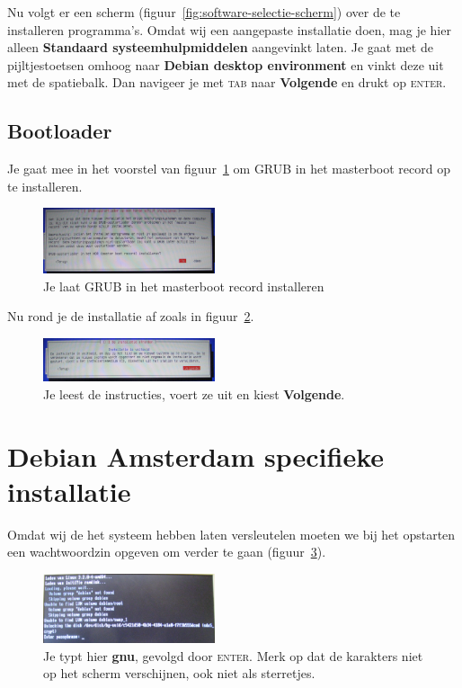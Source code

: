 \documentclass[12pt,a4paper]{article}
\begin{document}
Nu volgt er een scherm (figuur~\ref{fig:software-selectie-scherm}) over de te installeren programma's. Omdat wij een aangepaste installatie doen, mag je hier alleen \textbf{Standaard systeemhulpmiddelen} aangevinkt laten. Je gaat met de pijltjestoetsen omhoog naar \textbf{Debian desktop environment} en vinkt deze uit met de spatiebalk. Dan navigeer je met \textsc{tab} naar \textbf{Volgende} en drukt op \textsc{enter}.

\subsection{Bootloader}

Je gaat mee in het voorstel van figuur~\ref{fig:grub} om GRUB in het masterboot record op te installeren.


\begin{figure}[H]
\centering
\includegraphics[width=0.45\textwidth]{grub-installatie-scherm}
\caption{Je laat GRUB in het masterboot record installeren}
\label{fig:grub}
\end{figure}

Nu rond je de installatie af zoals in figuur~\ref{fig:afronden}.

\begin{figure}[H]
\centering
\includegraphics[width=0.45\textwidth]{installatie-afronden-scherm}
\caption{Je leest de instructies, voert ze uit en kiest \textbf{Volgende}.}
\label{fig:afronden}
\end{figure}

\section{Debian Amsterdam specifieke installatie}

Omdat wij de het systeem hebben laten versleutelen moeten we bij het opstarten een wachtwoordzin opgeven om verder te gaan (figuur~\ref{fig:diskwachtwoord}).

\begin{figure}[H]
\centering
\includegraphics[width=0.45\textwidth]{diskwachtwoordzin-scherm}
\caption{Je typt hier \textbf{gnu}, gevolgd door \textsc{enter}. Merk op dat de karakters niet op het scherm verschijnen, ook niet als sterretjes.}
\label{fig:diskwachtwoord}
\end{figure}
\end{document}
